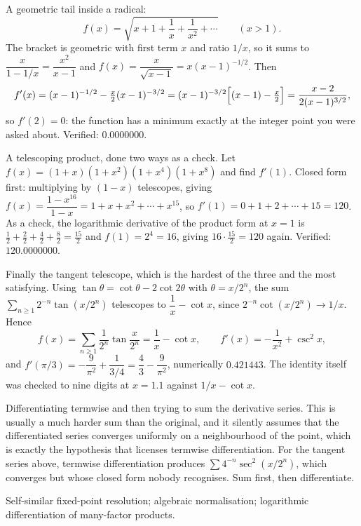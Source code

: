 \begin{worked}
A geometric tail inside a radical:
\[
f(x)=\sqrt{x+1+\frac1x+\frac1{x^{2}}+\cdots}\qquad(x>1).
\]
The bracket is geometric with first term $x$ and ratio $1/x$, so it sums to $\dfrac{x}{1-1/x}=\dfrac{x^{2}}{x-1}$ and $f(x)=\dfrac{x}{\sqrt{x-1}}=x(x-1)^{-1/2}$. Then
\[
f'(x)=(x-1)^{-1/2}-\tfrac{x}{2}(x-1)^{-3/2}=(x-1)^{-3/2}\Bigl[(x-1)-\tfrac x2\Bigr]=\frac{x-2}{2(x-1)^{3/2}},
\]
so $f'(2)=0$: the function has a minimum exactly at the integer point you were asked about. Verified: $0.0000000$.

A telescoping product, done two ways as a check. Let $f(x)=(1+x)(1+x^{2})(1+x^{4})(1+x^{8})$ and find $f'(1)$. Closed form first: multiplying by $(1-x)$ telescopes, giving $f(x)=\dfrac{1-x^{16}}{1-x}=1+x+x^{2}+\cdots+x^{15}$, so $f'(1)=0+1+2+\cdots+15=120$. As a check, the logarithmic derivative of the product form at $x=1$ is $\tfrac12+\tfrac22+\tfrac42+\tfrac82=\tfrac{15}{2}$ and $f(1)=2^{4}=16$, giving $16\cdot\tfrac{15}{2}=120$ again. Verified: $120.0000000$.

Finally the tangent telescope, which is the hardest of the three and the most satisfying. Using $\tan\theta=\cot\theta-2\cot2\theta$ with $\theta=x/2^{n}$, the sum $\sum_{n\geq1}2^{-n}\tan(x/2^{n})$ telescopes to $\dfrac1x-\cot x$, since $2^{-n}\cot(x/2^{n})\to1/x$. Hence
\[
f(x)=\sum_{n\geq1}\frac{1}{2^{n}}\tan\frac{x}{2^{n}}=\frac1x-\cot x,\qquad f'(x)=-\frac{1}{x^{2}}+\csc^{2}x,
\]
and $f'(\pi/3)=-\dfrac{9}{\pi^{2}}+\dfrac{1}{3/4}=\dfrac43-\dfrac{9}{\pi^{2}}$, numerically $0.421443$. The identity itself was checked to nine digits at $x=1.1$ against $1/x-\cot x$.
\end{worked}

\begin{trap}
Differentiating termwise and then trying to sum the derivative series. This is usually a much harder sum than the original, and it silently assumes that the differentiated series converges uniformly on a neighbourhood of the point, which is exactly the hypothesis that licenses termwise differentiation. For the tangent series above, termwise differentiation produces $\sum 4^{-n}\sec^{2}(x/2^{n})$, which converges but whose closed form nobody recognises. Sum first, then differentiate.
\end{trap}

\begin{seealsob}Self-similar fixed-point resolution; algebraic normalisation; logarithmic differentiation of many-factor products.\end{seealsob}

